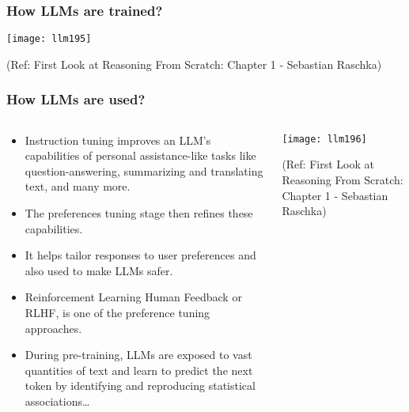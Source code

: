 \begin{frame}[fragile]\frametitle{How LLMs are trained?}

		\begin{center}
		\texttt{[image: llm195]}
		
		{\tiny (Ref: First Look at Reasoning From Scratch: Chapter 1 - Sebastian Raschka)}
	
		\end{center}

 
\end{frame}

\begin{frame}[fragile]\frametitle{How LLMs are used?}

\begin{columns}
    \begin{column}[T]{0.5\linewidth}
		\begin{itemize}
		  \item  Instruction tuning improves an LLM’s capabilities of personal assistance-like tasks like question-answering, summarizing and translating text, and many more. 
		  \item The preferences tuning stage then refines these capabilities. 
		  \item It helps tailor responses to user preferences and also used to make LLMs safer.
		  \item Reinforcement Learning Human Feedback or RLHF, is one of the preference tuning approaches.
		  \item During pre-training, LLMs are exposed to vast quantities of text and learn to predict the next token by identifying and reproducing statistical associations…
		\end{itemize}

    \end{column}
    \begin{column}[T]{0.5\linewidth}

		\begin{center}
		\texttt{[image: llm196]}
		
		{\tiny (Ref: First Look at Reasoning From Scratch: Chapter 1 - Sebastian Raschka)}
	
		\end{center}
    \end{column}
  \end{columns}

\end{frame}

